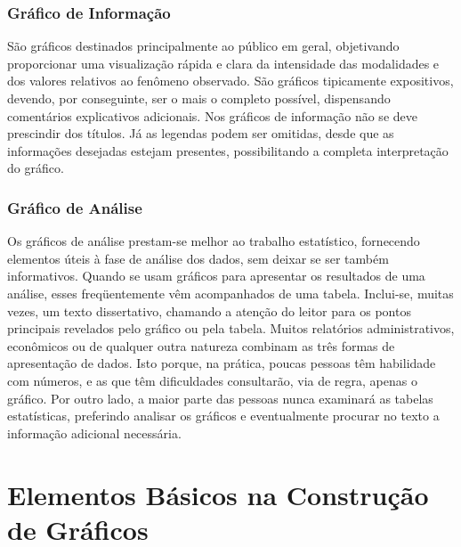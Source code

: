 \subsubsection{Gráfico de Informação}

\inic São gráficos destinados principalmente ao público em geral, objetivando proporcionar uma visualização rápida e clara da intensidade das modalidades e dos valores relativos ao fenômeno observado. São gráficos tipicamente expositivos, devendo, por conseguinte, ser o mais o completo possível, dispensando comentários explicativos adicionais. Nos gráficos de informação não se deve prescindir dos títulos. Já as legendas podem ser omitidas, desde que as informações desejadas  estejam presentes, possibilitando a completa interpretação do gráfico.

\subsubsection{Gráfico de Análise}

\inic Os gráficos de análise prestam-se melhor ao trabalho estatístico, fornecendo elementos úteis à fase de análise dos dados, sem deixar se ser também informativos. Quando se usam gráficos para apresentar os resultados de uma análise, esses freqüentemente vêm acompanhados de uma tabela. Inclui-se, muitas vezes, um texto dissertativo, chamando a atenção do leitor para os pontos principais revelados pelo gráfico ou pela tabela. Muitos relatórios administrativos, econômicos ou de qualquer outra natureza combinam as três formas de apresentação de dados. Isto porque, na prática, poucas pessoas têm habilidade com números, e as que têm dificuldades consultarão, via de regra, apenas o gráfico. Por outro lado, a maior parte das pessoas nunca examinará as tabelas estatísticas, preferindo analisar os gráficos e eventualmente procurar no texto a informação adicional necessária.\vskip0.3cm



















\section{Elementos  Básicos na Construção de Gráficos}

